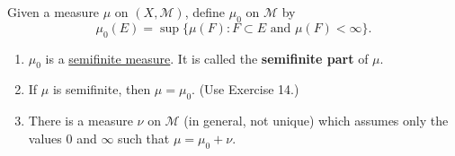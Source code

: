 	\begin{exercise}[Folland 1.15]
		Given a measure $\mu$ on $(X, \mathcal{M})$, define $\mu_0$ on $\mathcal{M}$ by 
		\begin{equation}
			\mu_0(E) = \sup\{\mu(F) : F \subset E \text{ and } \mu(F) < \infty\}.
		\end{equation}
		\begin{enumerate}[label=\textbf{\alph*.}]
			\item $\mu_0$ is a \hyperref[def:semifinite-measure]{semifinite measure}. It is called the \textbf{semifinite part} of $\mu$.
			\item If $\mu$ is semifinite, then $\mu = \mu_0$. (Use Exercise 14.)
			\item There is a measure $\nu$ on $\mathcal{M}$ (in general, not unique) which assumes only the values $0$ and $\infty$ such that $\mu = \mu_0 + \nu$.
		\end{enumerate}
	\end{exercise}
	\begin{solution}

	\end{solution}

